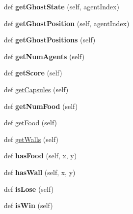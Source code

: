 \begin{DoxyCompactItemize}
def {\bfseries get\+Ghost\+State} (self, agent\+Index)
\item 
\mbox{\label{classpacman_1_1_game_state_a772374c3d2df51eda98d610baae1db8d}} 
def {\bfseries get\+Ghost\+Position} (self, agent\+Index)
\item 
\mbox{\label{classpacman_1_1_game_state_a4485dbbf65e0f98412a402edbbcb9a9a}} 
def {\bfseries get\+Ghost\+Positions} (self)
\item 
\mbox{\label{classpacman_1_1_game_state_ad19bd7f4416300f647108c86e5be28f4}} 
def {\bfseries get\+Num\+Agents} (self)
\item 
\mbox{\label{classpacman_1_1_game_state_a7b3dff620b0d5e278f3ce8813607f7f0}} 
def {\bfseries get\+Score} (self)
\item 
def \hyperlink{classpacman_1_1_game_state_a1221e5f48a5acae4f1794c352c8549e8}{get\+Capsules} (self)
\item 
\mbox{\label{classpacman_1_1_game_state_a8eb83a19a2e8f2fdaa3bfca97b66cd9f}} 
def {\bfseries get\+Num\+Food} (self)
\item 
def \hyperlink{classpacman_1_1_game_state_a532341ee8ed3d7940681bc6d1c489253}{get\+Food} (self)
\item 
def \hyperlink{classpacman_1_1_game_state_a770ccd37a37643829098559de97f4b09}{get\+Walls} (self)
\item 
\mbox{\label{classpacman_1_1_game_state_a01276bec7b87eefa3549473689990433}} 
def {\bfseries has\+Food} (self, x, y)
\item 
\mbox{\label{classpacman_1_1_game_state_a5b5f448d085c24a0c87f3d4abbbfa1c9}} 
def {\bfseries has\+Wall} (self, x, y)
\item 
\mbox{\label{classpacman_1_1_game_state_a10b8e79d9e31c753340d9edccf65f971}} 
def {\bfseries is\+Lose} (self)
\item 
\mbox{\label{classpacman_1_1_game_state_aa06e9b926f57f62892a5815ed45abde1}} 
def {\bfseries is\+Win} (self)

\end{DoxyCompactItemize}
